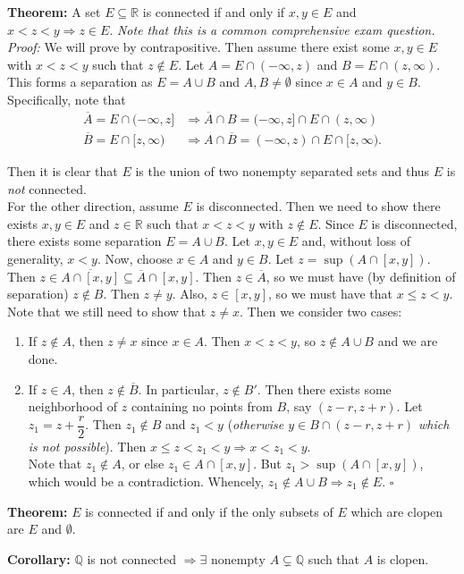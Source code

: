 \documentclass{article}
\begin{document}
\textbf{Theorem:} A set $E \subseteq \mathbb{R}$ is connected if and only if $x,y \in E$ and $x < z < y \Longrightarrow z \in E$. \textit{Note that this is a common comprehensive exam question.}\\

\textit{Proof:} We will prove by contrapositive. Then assume there exist some $x,y \in E$ with $x < z < y$ such that $z \notin E$. Let $A = E \cap (-\infty, z)$ and $B = E \cap (z, \infty)$. This forms a separation as $E = A \cup B$ and $A, B \neq \emptyset$ since $x \in A$ and $y \in B$. Specifically, note that 
\begin{align*}
    \overline{A} = E \cap (-\infty, z] &\Longrightarrow \overline{A} \cap B = (-\infty, z] \cap E \cap (z, \infty) \\
    \overline{B} = E \cap [z, \infty) &\Longrightarrow A \cap \overline{B} = (-\infty ,z) \cap E \cap [z, \infty). 
\end{align*}

Then it is clear that $E$ is the union of two nonempty separated sets and thus $E$ is \textit{not} connected. \\

For the other direction, assume $E$ is disconnected. Then we need to show there exists $x, y \in E$ and $z \in \mathbb{R}$ such that $x < z < y$ with $z \notin E$. Since $E$ is disconnected, there exists some separation $E = A \cup B$. Let $x,y \in E$ and, without loss of generality, $x < y$. Now, choose $x \in A$ and $y \in B$. Let $z = \sup{(A \cap [x,y])}$. Then $z \in \overline{A \cap [x,y]} \subseteq \overline{A} \cap [x,y]$. Then $z \in \overline{A}$, so we must have (by definition of separation) $z \notin B$. Then $z \neq y$. Also, $z \in [x,y]$, so we must have that $x \leq z < y$. Note that we still need to show that $z \neq x$. Then we consider two cases:
\begin{enumerate}
    \item If $z \notin A$, then $z \neq x$ since $x \in A$. Then $x < z < y$, so $z \notin A \cup B$ and we are done.
    \item If $z \in A$, then $z \notin \overline{B}$. In particular, $z \notin B'$. Then there exists some neighborhood of $z$ containing no points from $B$, say $(z-r,z+r)$. Let $z_1=z+\dfrac{r}{2}$. Then $z_1 \notin B$ and $z_1 < y$ (\textit{otherwise $y \in B \cap (z-r,z+r)$ which is not possible}). Then $x \leq z < z_1 < y \Longrightarrow x < z_1 < y$. \\
    Note that $z_1 \notin A$, or else $z_1 \in A \cap [x,y]$. But $z_1 > \sup{(A \cap [x,y])}$, which would be a contradiction. Whencely, $z_1 \notin A \cup B \Longrightarrow z_1 \notin E$. $\square$
\end{enumerate}

\textbf{Theorem:} $E$ is connected if and only if the only subsets of $E$ which are clopen are $E$ and $\emptyset$.

\textbf{Corollary:} $\mathbb{Q}$ is not connected $\Longrightarrow \exists \text{ nonempty } A \subsetneq \mathbb{Q}$ such that $A$ is clopen.
\end{document}

